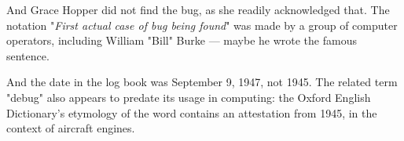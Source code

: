 And Grace Hopper did not find the bug, as she readily acknowledged that. The notation "\textit{First actual case of bug being found}" was made by a group of computer operators, including William "Bill" Burke — maybe he wrote the famous sentence.

And the date in the log book was September 9, 1947, not 1945. The related term "debug" also appears to predate its usage in computing: the Oxford English Dictionary's etymology of the word contains an attestation from 1945, in the context of aircraft engines.